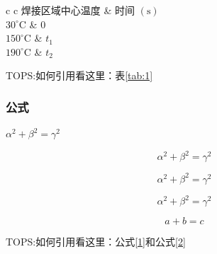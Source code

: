 \begin{table}[!htbp]
	\caption{表名}	\centering
	\begin{tabular}{c c}
		\hline {} { 焊接区域中心温度} & 时间 $(\mathrm{s})$ \\
		\hline $30^{\circ} \mathrm{C}$ & 0 \\
		$150^{\circ} \mathrm{C}$ & $t_{1}$ \\
		$190^{\circ} \mathrm{C}$ & $t_{2}$ \\
		\hline
		\label{tab:1}
	\end{tabular}
\end{table}

TOPS:如何引用看这里：表\ref{tab:1}

\subsubsection{公式}

$\alpha^2+\beta^2=\gamma^2$

$$ \alpha^2+\beta^2=\gamma^2$$

\begin{equation}\nonumber
	\alpha^2+\beta^2=\gamma^2
\end{equation}

\begin{equation}
	\alpha^2+\beta^2=\gamma^2 \label{1}
\end{equation}

\begin{equation}
	a+b=c \label{2}
\end{equation}

TOPS:如何引用看这里：公式\eqref{1}和公式\eqref{2}